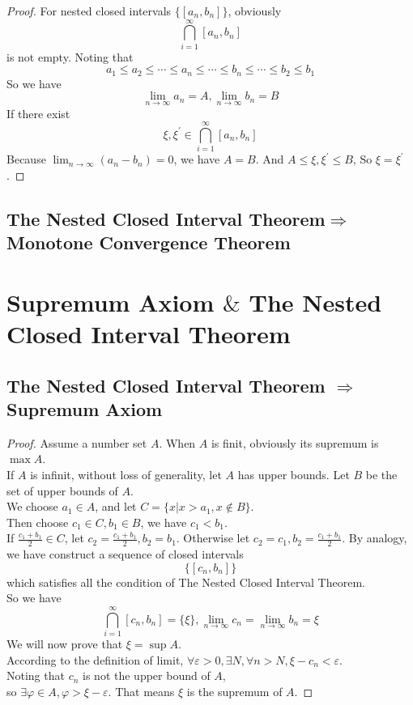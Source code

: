 \documentclass{article}
\begin{document}
\begin{proof}
    For nested closed intervals $\{[a_n, b_n ] \}$, obviously 
    $$\bigcap_{i = 1}^{\infty}[a_n, b_n] $$ is not empty.
    Noting that
    $$ a_1 \leqslant  a_2 \leqslant \cdots \leqslant a_n \leqslant \cdots \leqslant b_n \leqslant \cdots \leqslant b_2 \leqslant b_1 $$
    So we have 
    $$ \lim_{n \to \infty}a_n = A, \lim_{n \to \infty}b_n = B $$
    If there exist $$ \xi , \xi^{\prime}\in \bigcap_{i = 1}^{\infty}[a_n, b_n]$$
    Because $\lim_{n \to \infty}(a_n - b_n) = 0$, we have $A = B$. 
    And $A \leqslant \xi, \xi^{\prime} \leqslant B$, 
    So $\xi = \xi^{\prime}$. 
    \qedhere
\end{proof}

\subsection{The Nested Closed Interval Theorem$\Rightarrow$Monotone Convergence Theorem}



\section{Supremum Axiom $\&$  The Nested Closed Interval Theorem}

\subsection{The Nested Closed Interval Theorem $\Rightarrow$ Supremum Axiom}

\begin{proof}
    Assume a number set $A$. When $A$ is finit, obviously its supremum is $\max A$. \\
    If $A$ is infinit, without loss of generality, let $A$ has upper bounds. Let $B$ be the set of upper bounds of $A$. \\
    We choose $a_1 \in A$, and let $C = \{x| x > a_1, x\notin B\}$. \\
    Then choose $c_1 \in C, b_1 \in B$, we have $c_1 < b_1$. \\
    If $\displaystyle{\frac{c_1 + b_ 1}{2} \in C}$, let $c_2 = \displaystyle{\frac{c_1 + b_ 1}{2}}, b_2 = b_1$.
    Otherwise let $c_2 = c_1, b_2 = \displaystyle{\frac{c_1 + b_1}{2}}$.
    By analogy, we have construct a sequence of closed intervals $$\{[c_n, b_n]\}$$ which satisfies all the condition of The Nested Closed Interval Theorem. \\
    So we have $$ \bigcap_{i = 1}^{\infty}[c_n, b_n] = \{\xi\}, \lim_{n \to \infty} c_n =\lim_{n \to \infty} b_n = \xi $$
    We will now prove that $\xi = \sup A$. \\
    According to the definition of limit, $\forall \varepsilon > 0, \exists N, \forall n > N, \xi - c_n < \varepsilon $. \\
    Noting that $c_n$ is not the upper bound of $A$, \\
    so $\exists \varphi \in A, \varphi > \xi - \varepsilon$.
    That means $\xi$ is the supremum of $A$.
\end{proof}
\end{document}

